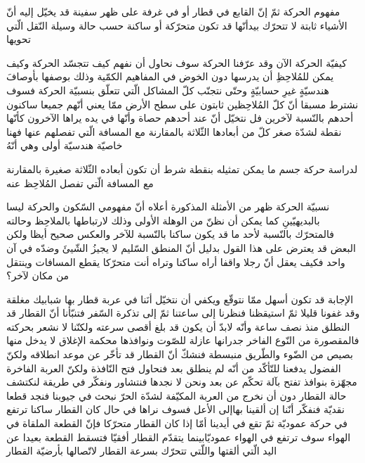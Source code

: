 \begin{section}{مفهوم الحركة}
ثمّ إنّ القابع في قطار أو في غرفة على ظهر سفينة قد يخيّل إليه أنّ الأشياء ثابتة لا تتحرّك بيدأنّها قد تكون متحرّكة أو ساكنة حسب حالة وسيلة النّقل الّتي تحويها
\begin{subsection}{كيفيّة الحركة}
الآن وقد عرّفنا الحركة سوف نحاول أن نفهم كيف تتجسّد الحركة وكيف يمكن للمُلاحِظِ أن يدرسها دون الخوض في المفاهيم الكمّية وذلك بوصفها بأوصافَ هندسيّةٍ غيرِ حسابيّةٍ وحتّى نتجنّب كلّ المشاكل الّتي تتعلّق بنسبيّة الحركة فسوف نشترط مسبقا أنّ كلّ المُلاحِظين ثابتون على سطح الأرض ممّا يعني أنّهم جميعا ساكنون أحدهم بالنّسبة لآخرين فل نتخيّل أنّ عند أحدهم حصاة وأنّها في يده يراها الآخرون كأنّها نقطة لشدّة صغر كلّ من أبعادها الثّلاثة بالمقارنة مع المسافة الّتي تفصلهم عنها فهنا خاصيّة هندسيّة أولى وهي أنّهُ
\begin{definition}
{\large لدراسة حركة جسم ما يمكن تمثيله بنقطة شرط أن تكون أبعاده الثّلاثة صغيرة بالمقارنة مع المسافة الّتي تفصل المُلاحِظ عنه}
\end{definition}
\end{subsection}
\begin{subsection}{نسبيّة الحركة}
ظهر من الأمثلة المذكورة أعلاه أنّ مفهومي السّكون والحركة ليسا بالبديهيّينِ كما يمكن أن نظنّ من الوهلة الأولى وذلك لارتباطها بالملاحِظ وحالته فالمتحرّك بالنّسبة لأحد ما قد يكون ساكنا بالنّسبة للآخر والعكس صحيح أيظا ولكن البعض قد يعترض على هذا القول بدليل أنّ المنطق السّليم لا يجيزُ الشّيئَ وضدّه في آن واحد فكيف يعقل أنّ رجلا واقفا أراه ساكنا وتراه أنت متحرّكا يقطع المسافات وينتقل من مكان لآخر؟

الإجابة قد تكون أسهل ممّا نتوقّع ويكفي أن نتخيّل أنَنا في عربة قطار بها شبابيك مغلقة وقد غفونا قليلا ثمّ استيقظنا فنظرنا إلى ساعتنا ثمّ إلى تذكرة السّفر فتنبّأنا أنّ القطار قد النطلق منذ نصف ساعة وأنّه لابدّ أن يكون قد بلغ أقصى سرعته ولكنّنا لا نشعر بحركته فالمقصورة من النّوع الفاخر جدرانها عازلة للصّوت ونوافذها محكمة الإغلاق لا يدخل منها بصيص من الضّوء والطّريق منبسطة فنشكّ أنّ القطار قد تأخّر عن موعد انطلاقه ولكنّ الفضول يدفعنا للتّأكّد من أنّه لم ينطلق بعد فنحاول فتح النّافذة ولكنّ العربة الفاخرة مجهّزة بنوافذ تفتح بآلة تحكّم عن بعد ونحن لا نجدها فنتشاور ونفكّر في طريقة لنكتشف حالة القطار دون أن نخرج من العربة المكيّفة لشدّة الحرّ نبحث في جيوبنا فنجد قطعا نقديّة فنفكّر أنّنا إن ألقينا بهاإلى الأعل فسوف نراها في حال كان القطار ساكنا ترتفع في حركة عموديّة ثمّ تقع في أيدينا أمّا إذا كان القطار متحرّكا فإنّ القطعة الملقاة في الهواء سوف ترتفع في الهواء عموديّابينما يتقدّم القطار أفقيّا فتسقط القطعة بعيدا عن اليد الّتي ألقتها واللّتي تتحرّك بسرعة القطار لاتّصالها بأرضيّة القطار

\begin{center}
\end{center}
\end{subsection}
\end{section}
